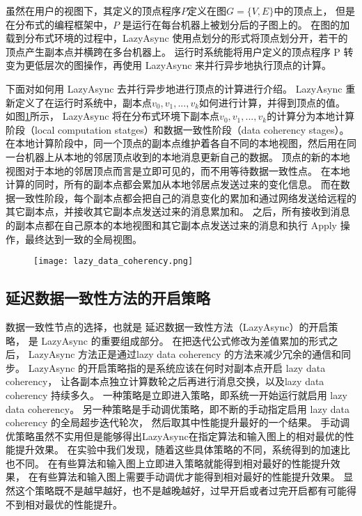 虽然在用户的视图下，其定义的顶点程序$P$定义在图$G = \{V,E\}$中的顶点上，
但是在分布式的编程框架中，$P$ 是运行在每台机器上被划分后的子图上的。
在图的加载到分布式环境的过程中，LazyAsync 使用点划分的形式将顶点划分开，若干的顶点产生副本点并横跨在多台机器上。
运行时系统能将用户定义的顶点程序 P 转变为更低层次的图操作，再使用 LazyAsync 来并行异步地执行顶点的计算。

下面对如何用 LazyAsync 去并行异步地进行顶点的计算进行介绍。
LazyAsync 重新定义了在运行时系统中，副本点$v_0 , v_1 , ... , v_k$如何进行计算，并得到顶点的值。
如图\ref{fig:lazy_data_coherency}所示，
LazyAsync 将在分布式环境下副本点$v_0 , v_1 , ... , v_k$的计算分为本地计算阶段（local computation statges）和数据一致性阶段（data coherency stages）。
在本地计算阶段中，同一个顶点的副本点维护着各自不同的本地视图，然后用在同一台机器上从本地的邻居顶点收到的本地消息更新自己的数据。
顶点的新的本地视图对于本地的邻居顶点而言是立即可见的，而不用等待数据一致性点。
在本地计算的同时，所有的副本点都会累加从本地邻居点发送过来的变化信息。
而在数据一致性阶段，每个副本点都会把自己的消息变化的累加和通过网络发送给远程的其它副本点，并接收其它副本点发送过来的消息累加和。
之后，所有接收到消息的副本点都在自己原本的本地视图和其它副本点发送过来的消息和执行 Apply 操作，最终达到一致的全局视图。
\begin{figure}[!htbp]
\centering
\texttt{[image: lazy\_data\_coherency.png]}
\label{fig:lazy_data_coherency}
\end{figure}

\subsection{延迟数据一致性方法的开启策略}

数据一致性节点的选择，也就是 延迟数据一致性方法（LazyAsync）的开启策略， 是 LazyAsync 的重要组成部分。
在把迭代公式修改为差值累加的形式之后， LazyAsync 方法正是通过lazy data coherency 的方法来减少冗余的通信和同步。
LazyAsync 的开启策略指的是系统应该在何时对副本点开启 lazy data coherency，
让各副本点独立计算数轮之后再进行消息交换，以及lazy data coherency 持续多久。
一种策略是立即进入策略，即系统一开始运行就启用 lazy data coherency。
另一种策略是手动调优策略，即不断的手动指定启用 lazy data coherency 的全局超步迭代轮次，
然后取其中性能提升最好的一个结果。
手动调优策略虽然不实用但是能够得出LazyAsync在指定算法和输入图上的相对最优的性能提升效果。
在实验中我们发现，随着这些具体策略的不同，系统得到的加速比也不同。
在有些算法和输入图上立即进入策略就能得到相对最好的性能提升效果，
在有些算法和输入图上需要手动调优才能得到相对最好的性能提升效果。
显然这个策略既不是越早越好，也不是越晚越好，过早开启或者过完开启都有可能得不到相对最优的性能提升。

